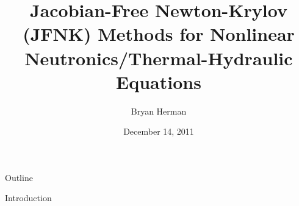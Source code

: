 \documentclass{beamer}
\title[JFNK Methods for Coupled Nonlinear Systems]{Jacobian-Free Newton-Krylov (JFNK) Methods for Nonlinear Neutronics/Thermal-Hydraulic Equations}
\author[]{Bryan Herman}
\institute[\insertpagenumber]{}
\date{December 14, 2011}
\begin{document}

\frame{\titlepage}

\begin{frame}{Outline}
  \tableofcontents{}
\end{frame}

\begin{section}{Introduction}

\begin{comment}
\begin{frame}{Motivation and Objective}

  \begin{customlist}{2ex}{0pt}

    \item Eventually will be part of thesis work
    \vfill\item JFNK method not currently used in nuclear reactor 
		analysis
    \vfill\item Incorporates a lot of ideas from 2.29 class
    \vfill\item Implement JFNK framework for coupled physics
    \vfill\item Test implementation on a simple model 

  \end{customlist}


\end{comment}
\end{section}
\end{document}
